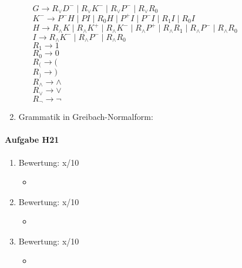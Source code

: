 \documentclass[11pt]{article}
\begin{document}
\begin{enumerate}
\begin{itemize}
\\\hspace*{6mm} $G \rightarrow R_{\vee}D^{-} \mid R_{\vee}K^{-} \mid R_{\vee}P^{-} \mid R_{\vee}R_{0}$
\\\hspace*{6mm} $K^{-} \rightarrow P^{-} H\mid PI \mid R_{0}H \mid P^{+}I \mid P^{-}I \mid R_{1}I \mid R_{0}I$
\\\hspace*{6mm} $H \rightarrow R_{\wedge} K \mid R_{\wedge} K^{+} \mid R_{\wedge} K^{-} \mid R_{\wedge} P^{+} \mid R_{\wedge} R_{1} \mid R_{\wedge} P^{-} \mid R_{\wedge} R_{0}$
\\\hspace*{6mm} $I \rightarrow R_{\wedge} K^{-} \mid R_{\wedge} P^{-} \mid R_{\wedge}R_{0}$
\\\hspace*{6mm} $R_{1} \rightarrow 1$
\\\hspace*{6mm} $R_{0} \rightarrow 0$
\\\hspace*{6mm} $R_{(} \rightarrow ($
\\\hspace*{6mm} $R_{)} \rightarrow )$
\\\hspace*{6mm} $R_{\wedge} \rightarrow \wedge$
\\\hspace*{6mm} $R_{\vee} \rightarrow \vee$
\\\hspace*{6mm} $R_{\neg} \rightarrow \neg$
\end{itemize}
\item Grammatik in Greibach-Normalform:
\end{enumerate}


\paragraph{Aufgabe H21}
\begin{enumerate}[label=\alph*)]
\item Bewertung: x/10
\begin{itemize}
\item 
\end{itemize}

\item Bewertung: x/10
\begin{itemize}
\item
\end{itemize}

\item Bewertung: x/10
\begin{itemize}
\item
\end{itemize}
\end{enumerate}
\end{document}
